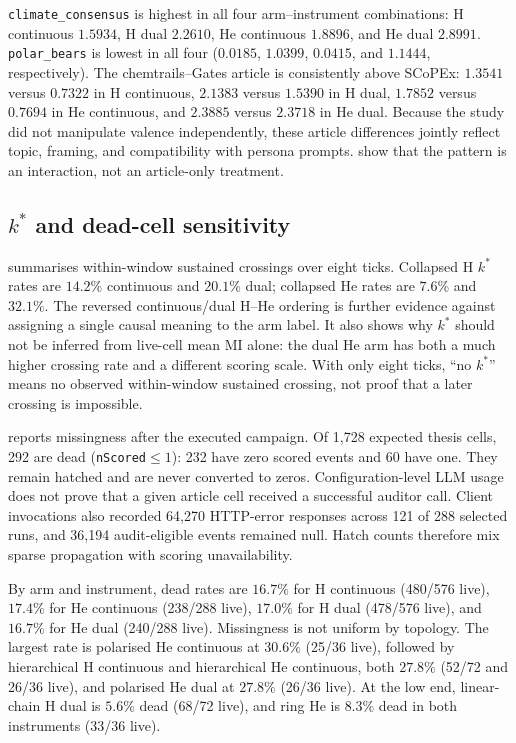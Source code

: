 \texttt{climate\_consensus} is highest in all four arm--instrument
combinations: H continuous \(1.5934\), H dual \(2.2610\), He continuous
\(1.8896\), and He dual \(2.8991\).  \texttt{polar\_bears} is lowest in all
four (\(0.0185\), \(1.0399\), \(0.0415\), and \(1.1444\), respectively).
The chemtrails--Gates article is consistently above SCoPEx: \(1.3541\) versus
\(0.7322\) in H continuous, \(2.1383\) versus \(1.5390\) in H dual,
\(1.7852\) versus \(0.7694\) in He continuous, and \(2.3885\) versus
\(2.3718\) in He dual.  Because the study did not manipulate valence independently, these article
differences jointly reflect topic, framing, and compatibility with persona
prompts.  show that the
pattern is an interaction, not an article-only treatment.

\subsection{\texorpdfstring{\(k^{*}\)}{k-star} and dead-cell sensitivity}

 summarises within-window sustained crossings over eight
ticks. Collapsed H \(k^{*}\) rates are \(14.2\%\) continuous and \(20.1\%\)
dual; collapsed He rates are \(7.6\%\) and \(32.1\%\). The reversed
continuous/dual H--He ordering is further evidence against assigning a single
causal meaning to the arm label. It also shows why \(k^{*}\) should not be
inferred from live-cell mean MI alone: the dual He arm has both a much higher
crossing rate and a different scoring scale. With only eight ticks, ``no
\(k^{*}\)'' means no observed within-window sustained crossing, not proof that
a later crossing is impossible.

 reports missingness after the executed campaign. Of
1,728 expected thesis cells, 292 are dead (\texttt{nScored}\(\leq 1\)): 232
have zero scored events and 60 have one. They remain hatched and are never
converted to zeros. Configuration-level LLM usage does not prove that a given
article cell received a successful auditor call. Client invocations also
recorded 64,270 HTTP-error responses across 121 of 288 selected runs, and
36,194 audit-eligible events remained null. Hatch counts therefore mix sparse
propagation with scoring unavailability.

By arm and instrument, dead rates are \(16.7\%\) for H continuous (480/576
live), \(17.4\%\) for He continuous (238/288 live), \(17.0\%\) for H dual
(478/576 live), and \(16.7\%\) for He dual (240/288 live). Missingness is not
uniform by topology. The largest rate is polarised He continuous at
\(30.6\%\) (25/36 live), followed by hierarchical H continuous and
hierarchical He continuous, both \(27.8\%\) (52/72 and 26/36 live), and
polarised He dual at \(27.8\%\) (26/36 live). At the low end, linear-chain H
dual is \(5.6\%\) dead (68/72 live), and ring He is \(8.3\%\) dead in both
instruments (33/36 live).

